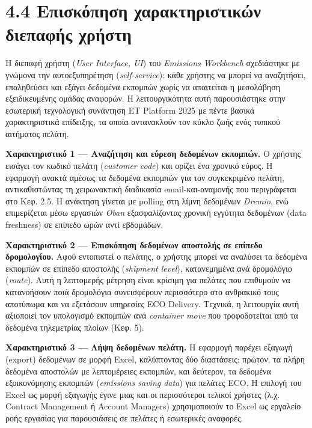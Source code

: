 \section{4.4 Επισκόπηση χαρακτηριστικών διεπαφής
χρήστη}\label{ux3b5ux3c0ux3b9ux3c3ux3baux3ccux3c0ux3b7ux3c3ux3b7-ux3c7ux3b1ux3c1ux3b1ux3baux3c4ux3b7ux3c1ux3b9ux3c3ux3c4ux3b9ux3baux3ceux3bd-ux3b4ux3b9ux3b5ux3c0ux3b1ux3c6ux3aeux3c2-ux3c7ux3c1ux3aeux3c3ux3c4ux3b7}

Η διεπαφή χρήστη (\emph{User Interface, UI}) του \emph{Emissions
Workbench} σχεδιάστηκε με γνώμονα την αυτοεξυπηρέτηση
(\emph{self-service}): κάθε χρήστης να μπορεί να αναζητήσει, επαληθεύσει
και εξάγει δεδομένα εκπομπών χωρίς να απαιτείται η μεσολάβηση
εξειδικευμένης ομάδας αναφορών. Η λειτουργικότητα αυτή παρουσιάστηκε
στην εσωτερική τεχνολογική συνάντηση ET Platform 2025 με πέντε βασικά
χαρακτηριστικά επίδειξης, τα οποία αντανακλούν τον κύκλο ζωής ενός
τυπικού αιτήματος πελάτη.

\textbf{Χαρακτηριστικό 1 --- Αναζήτηση και εύρεση δεδομένων εκπομπών.} Ο
χρήστης εισάγει τον κωδικό πελάτη (\emph{customer code}) και ορίζει ένα
χρονικό εύρος. Η εφαρμογή ανακτά αμέσως τα δεδομένα εκπομπών για τον
συγκεκριμένο πελάτη, αντικαθιστώντας τη χειρωνακτική διαδικασία
email-και-αναμονής που περιγράφεται στο Κεφ. 2.5. Η ανάκτηση γίνεται με
polling στη λίμνη δεδομένων \emph{Dremio}, ενώ επιμερίζεται μέσω
εργασιών \emph{Oban} εξασφαλίζοντας χρονική εγγύτητα δεδομένων (data
freshness) σε επίπεδο ωρών αντί εβδομάδων.

\textbf{Χαρακτηριστικό 2 --- Επισκόπηση δεδομένων αποστολής σε επίπεδο
δρομολογίου.} Αφού εντοπιστεί ο πελάτης, ο χρήστης μπορεί να αναλύσει τα
δεδομένα εκπομπών σε επίπεδο αποστολής (\emph{shipment level}),
κατανεμημένα ανά δρομολόγιο (\emph{route}). Αυτή η λεπτομερής μέτρηση
είναι κρίσιμη για πελάτες που επιθυμούν να κατανοήσουν ποιά δρομολόγια
συνεισφέρουν περισσότερο στο ανθρακικό τους αποτύπωμα και να εξετάσουν
υπηρεσίες ECO Delivery. Τεχνικά, η λειτουργία αυτή αξιοποιεί τον
υπολογισμό εκπομπών ανά \emph{container move} που τροφοδοτείται από τα
δεδομένα τηλεμετρίας πλοίων (Κεφ. 5).

\textbf{Χαρακτηριστικό 3 --- Λήψη δεδομένων πελάτη.} Η εφαρμογή παρέχει
εξαγωγή (export) δεδομένων σε μορφή Excel, καλύπτοντας δύο διαστάσεις:
πρώτον, τα πλήρη δεδομένα αποστολών με λεπτομέρειες εκπομπών, και
δεύτερον, τα δεδομένα εξοικονόμησης εκπομπών (\emph{emissions saving
data}) για πελάτες ECO. Η επιλογή του Excel ως μορφή εξαγωγής έγινε μιας
και οι περισσότεροι τελικοί χρήστες (λ.χ. Contract Management ή Account
Managers) χρησιμοποιούν το Excel ως εργαλείο ροής εργασίας για
παρουσιάσεις σε πελάτες ή εσωτερικές αναφορές.


